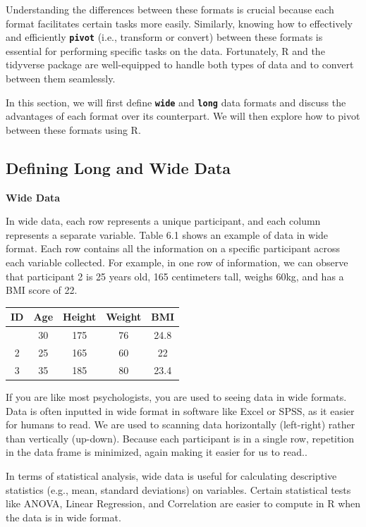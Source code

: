 \documentclass[
]{book}
\begin{document}
Understanding the differences between these formats is crucial because each format facilitates certain tasks more easily. Similarly, knowing how to effectively and efficiently \textbf{\texttt{pivot}} (i.e., transform or convert) between these formats is essential for performing specific tasks on the data. Fortunately, R and the tidyverse package are well-equipped to handle both types of data and to convert between them seamlessly.

In this section, we will first define \textbf{\texttt{wide}} and \textbf{\texttt{long}} data formats and discuss the advantages of each format over its counterpart. We will then explore how to pivot between these formats using R.

\subsection{Defining Long and Wide Data}\label{defining-long-and-wide-data}

\textbf{Wide Data}

In wide data, each row represents a unique participant, and each column represents a separate variable. Table 6.1 shows an example of data in wide format. Each row contains all the information on a specific participant across each variable collected. For example, in one row of information, we can observe that participant 2 is 25 years old, 165 centimeters tall, weighs 60kg, and has a BMI score of 22.

\begin{longtable}[]{@{}ccccc@{}}
\toprule\noalign{}
ID & Age & Height & Weight & BMI \\
\midrule\noalign{}
\endhead
\bottomrule\noalign{}
\endlastfoot
1 & 30 & 175 & 76 & 24.8 \\
2 & 25 & 165 & 60 & 22 \\
3 & 35 & 185 & 80 & 23.4 \\
\end{longtable}

If you are like most psychologists, you are used to seeing data in wide formats. Data is often inputted in wide format in software like Excel or SPSS, as it easier for humans to read. We are used to scanning data horizontally (left-right) rather than vertically (up-down). Because each participant is in a single row, repetition in the data frame is minimized, again making it easier for us to read..

In terms of statistical analysis, wide data is useful for calculating descriptive statistics (e.g., mean, standard deviations) on variables. Certain statistical tests like ANOVA, Linear Regression, and Correlation are easier to compute in R when the data is in wide format.
\end{document}
